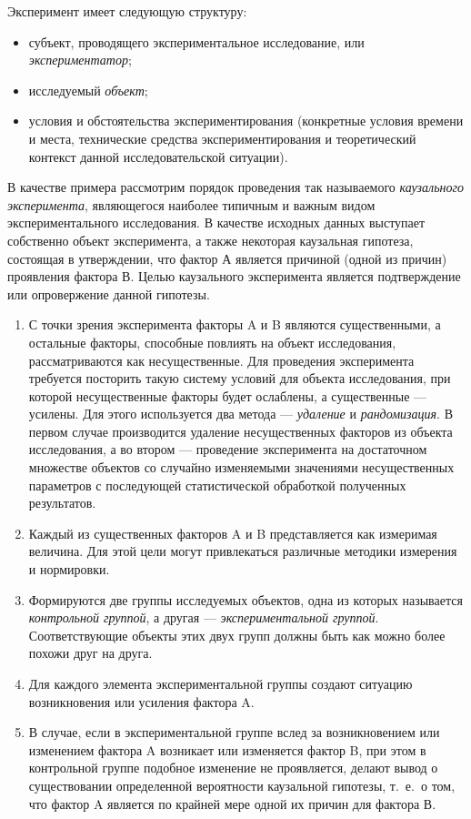 Эксперимент имеет следующую структуру:
\begin{itemize}
\item субъект, проводящего экспериментальное исследование, или \emph{экспериментатор};
\item исследуемый \emph{объект};
\item условия и обстоятельства экспериментирования
  (конкретные условия времени и места,
  технические средства экспериментирования и теоретический контекст
  данной исследовательской ситуации).
\end{itemize}

В качестве примера рассмотрим порядок проведения так называемого
\emph{каузального эксперимента}, являющегося наиболее типичным
и важным видом экспериментального исследования.
В качестве исходных данных выступает собственно объект эксперимента,
а также некоторая каузальная гипотеза, состоящая в утверждении,
что фактор А является причиной (одной из причин) проявления фактора В.
Целью каузального эксперимента является подтверждение или опровержение данной гипотезы.
\begin{enumerate}
\item С точки зрения эксперимента факторы A и B являются существенными,
  а остальные факторы, способные повлиять на объект исследования,
  рассматриваются как несущественные.
  Для проведения эксперимента требуется посторить такую систему условий
  для объекта исследования, при которой несущественные факторы будет ослаблены,
  а существенные --- усилены.
  Для этого используется два метода --- \emph{удаление} и \emph{рандомизация}.
  В первом случае производится удаление несущественных факторов из
  объекта исследования, а во втором --- проведение эксперимента на достаточном
  множестве объектов со случайно изменяемыми значениями несущественных параметров
  с последующей статистической обработкой полученных результатов.
\item Каждый из существенных факторов A и B представляется как измеримая величина.
  Для этой цели могут привлекаться различные методики измерения и нормировки.
\item Формируются две группы исследуемых объектов, одна из которых называется
  \emph{контрольной группой}, а другая --- \emph{экспериментальной группой}.
  Соответствующие объекты этих двух групп должны быть как можно более
  похожи друг на друга.
\item Для каждого элемента экспериментальной группы создают ситуацию
  возникновения или усиления фактора A.
\item В случае, если в экспериментальной группе вслед за возникновением
  или изменением фактора A возникает или изменяется фактор B,
  при этом в контрольной группе подобное изменение не проявляется,
  делают вывод о существовании определенной вероятности каузальной гипотезы,
  т.~е.~о том, что фактор A является по крайней мере одной их причин для фактора В.
\end{enumerate}

